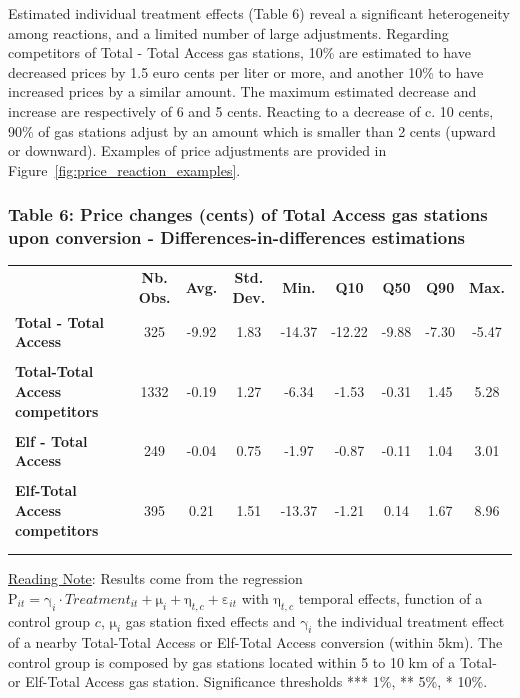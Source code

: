 \documentclass[english]{article}
\begin{document}
Estimated individual treatment effects (Table 6) reveal a significant heterogeneity among reactions, and a limited number of large adjustments. Regarding competitors of Total - Total Access gas stations, 10\% are estimated to have decreased prices by 1.5 euro cents per liter or more, and another 10\% to have increased prices by a similar amount. The maximum estimated decrease and increase are respectively of 6 and 5 cents. Reacting to a decrease of c. 10 cents, 90\% of gas stations adjust by an amount which is smaller than 2 cents (upward or downward). Examples of price adjustments are provided in Figure~\ref{fig:price_reaction_examples}. \medskip{}

\newpage{}

\subsubsection*{Table 6: Price changes (cents) of Total Access gas  stations upon conversion - Differences-in-differences estimations}

\begin{center}
\begin{scriptsize} %
\begin{tabular}{llcccccccc}
 &  &  &  &  &  &  &  &  & \tabularnewline
\hline
\hline
 &  & \textbf{Nb. Obs.}  & \textbf{Avg.}  & \textbf{Std. Dev.}  & \textbf{Min.}  & \textbf{Q10}  & \textbf{Q50}  & \textbf{Q90}  & \textbf{Max.}\tabularnewline
\hline
\textbf{Total - Total Access}  &  & 325  & -9.92  & 1.83  & -14.37  & -12.22  & -9.88  & -7.30  & -5.47\tabularnewline
 &  &  &  &  &  &  &  &  & \tabularnewline
\textbf{Total-Total Access competitors}  &  & 1332  & -0.19  & 1.27  & -6.34  & -1.53  & -0.31  & 1.45  & 5.28\tabularnewline
 &  &  &  &  &  &  &  &  & \tabularnewline
\hline
\textbf{Elf - Total Access}  &  & 249  & -0.04  & 0.75  & -1.97  & -0.87  & -0.11  & 1.04  & 3.01\tabularnewline
 &  &  &  &  &  &  &  &  & \tabularnewline
\textbf{Elf-Total Access competitors}  &  & 395  & 0.21  & 1.51  & -13.37  & -1.21  & 0.14  & 1.67  & 8.96\tabularnewline
 &  &  &  &  &  &  &  &  & \tabularnewline
\hline
\hline
 &  &  &  &  &  &  &  &  & \tabularnewline
\end{tabular}\end{scriptsize}
\par\end{center}

{\small{}\uline{Reading Note}}{\small{}:} Results come from the regression $\mathrm{P}_{it}=\mathrm{\gamma}_{i}\cdot Treatment_{it}+\mathrm{\mu}_{i}+\mathrm{\eta}_{t,c}+\mathrm{\varepsilon}_{it}$ with $\mathrm{\eta}_{t,c}$ temporal effects, function of a control group $c$, $\mathrm{\mu}_{i}$ gas station fixed effects and $\mathrm{\gamma}_{i}$ the individual treatment effect of a nearby Total-Total Access or Elf-Total Access conversion (within 5km). The control group is composed by gas stations located within 5 to 10 km of a Total- or Elf-Total Access gas station. Significance thresholds {*}{*}{*} 1\%, {*}{*} 5\%, {*} 10\%.\medskip{}
\end{document}
